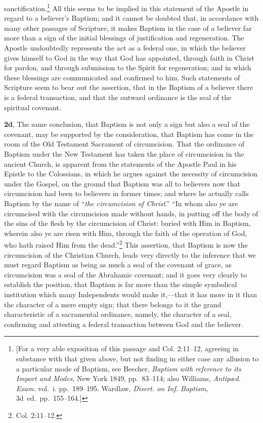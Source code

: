 \documentclass[
]{book}
\begin{document}
sanctification.\footnote{{[}For a very able exposition of this passage and Col. 2:11--12, agreeing in substance with that given above, but not finding in either case any allusion to a particular mode of Baptism, see Beecher, \emph{Baptism with reference to its Import and Modes}, New York 1849, pp.~83--114; also Williams, \emph{Antipæd. Exam.} vol.~i. pp.~189--195. Wardlaw, \emph{Disert. on Inf. Baptism}, 3d~ed.~pp.~155--164.{]}} All this seems to be implied in this statement of the Apostle in regard to a believer's Baptism; and it cannot be doubted that, in accordance with many other passages of Scripture, it makes Baptism in the case of a believer far more than a sign of the initial blessings of justification and regeneration. The Apostle undoubtedly represents the act as a federal one, in which the believer gives himself to God in the way that God has appointed, through faith in Christ for pardon, and through submission to the Spirit for regeneration; and in which these blessings are communicated and confirmed to him. Such statements of Scripture seem to bear out the assertion, that in the Baptism of a believer there is a federal transaction, and that the outward ordinance is the seal of the spiritual covenant.

\textbf{2d}, The same conclusion, that Baptism is not only a sign but also a seal of the covenant, may be supported by the consideration, that Baptism has come in the room of the Old Testament Sacrament of circumcision. That the ordinance of Baptism under the New Testament has taken the place of circumcision in the ancient Church, is apparent from the statements of the Apostle Paul in his Epistle to the Colossians, in which he argues against the necessity of circumcision under the Gospel, on the ground that Baptism was all to believers now that circumcision had been to believers in former times; and where he actually calls Baptism by the name of ``\emph{the circumcision of Christ}.'' ``In whom also ye are circumcised with the circumcision made without hands, in putting off the body of the sins of the flesh by the circumcision of Christ: buried with Him in Baptism, wherein also ye are risen with Him, through the faith of the operation of God, who hath raised Him from the dead.''\footnote{Col. 2:11--12.} This assertion, that Baptism is now the circumcision of the Christian Church, leads very directly to the inference that we must regard Baptism as being as much a seal of the covenant of grace, as circumcision was a seal of the Abrahamic covenant; and it goes very clearly to establish the position, that Baptism is far more than the simple symbolical institution which many Independents would make it,---that it has more in it than the character of a mere empty sign; that there belongs to it the grand characteristic of a sacramental ordinance, namely, the character of a seal, confirming and attesting a federal transaction between God and the believer.
\end{document}
